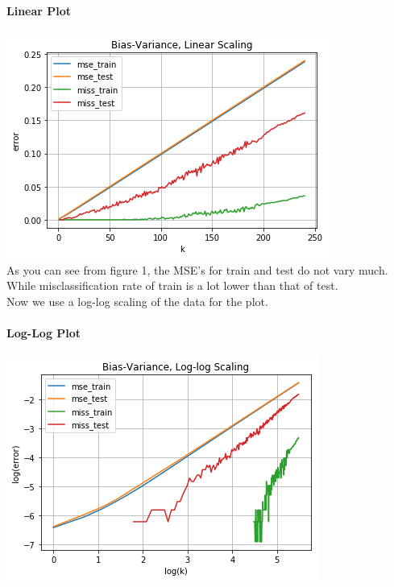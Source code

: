 \documentclass[a4paper]{article}
\begin{document}
\textbf{Linear Plot} \\ \\
\includegraphics[scale=.95]{./1.png} \\ 
As you can see from figure 1, the MSE's for train and test do not vary much. While misclassification rate of train is a lot lower than that of test. \\

Now we use a log-log scaling of the data for the plot. \\ \\
\textbf{Log-Log Plot} \\ \\
\includegraphics[scale=.95]{2.png}
\end{document}
